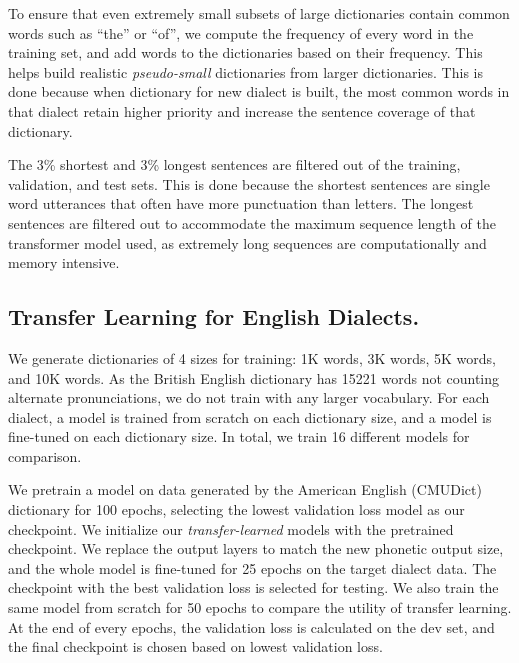 To ensure that even extremely small subsets of large dictionaries contain common words such as ``the'' or ``of'', we compute the frequency of every word in the training set, and add words to the dictionaries based on their frequency. This helps build realistic \emph{pseudo-small} dictionaries from larger dictionaries. This is done because when dictionary for new dialect is built, the most common words in that dialect retain higher priority and increase the sentence coverage of that dictionary.

The 3\% shortest and 3\% longest sentences are filtered out of the training, validation, and test sets. This is done because the shortest sentences are single word utterances that often have more punctuation than letters. The longest sentences are filtered out to accommodate the maximum sequence length of the transformer model used, as extremely long sequences are computationally and memory intensive.
% 
\subsection{Transfer Learning for English Dialects.} 
We generate dictionaries of 4 sizes for training: 1K words, 3K words, 5K words, and 10K words.  As the British English dictionary has 15221 words not counting alternate pronunciations, we do not train with any larger vocabulary.  For each dialect, a model is trained from scratch on each dictionary size, and a model is fine-tuned on each dictionary size.  In total, we train 16 different models for comparison.

We pretrain a model on data generated by the American English (CMUDict) dictionary for 100 epochs, selecting the lowest validation loss model as our checkpoint. We initialize our \emph{transfer-learned} models with the pretrained checkpoint.  We replace the output layers to match the new phonetic output size, and the whole model is fine-tuned for 25 epochs on the target dialect data. The checkpoint with the best validation loss is selected for testing. We also train the same model from scratch for 50 epochs to compare the utility of transfer learning.  At the end of every epochs, the validation loss is calculated on the dev set, and the final checkpoint is chosen based on lowest validation loss.

